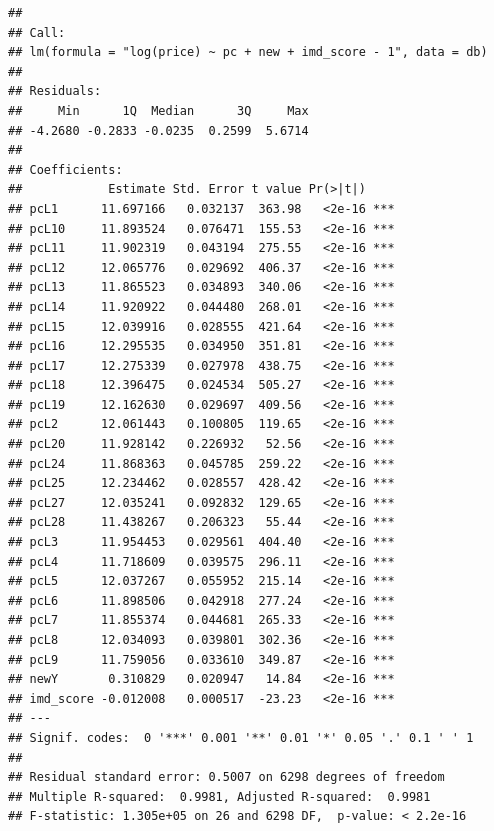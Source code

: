 \documentclass[
]{book}
\begin{document}
\begin{verbatim}
## 
## Call:
## lm(formula = "log(price) ~ pc + new + imd_score - 1", data = db)
## 
## Residuals:
##     Min      1Q  Median      3Q     Max 
## -4.2680 -0.2833 -0.0235  0.2599  5.6714 
## 
## Coefficients:
##            Estimate Std. Error t value Pr(>|t|)    
## pcL1      11.697166   0.032137  363.98   <2e-16 ***
## pcL10     11.893524   0.076471  155.53   <2e-16 ***
## pcL11     11.902319   0.043194  275.55   <2e-16 ***
## pcL12     12.065776   0.029692  406.37   <2e-16 ***
## pcL13     11.865523   0.034893  340.06   <2e-16 ***
## pcL14     11.920922   0.044480  268.01   <2e-16 ***
## pcL15     12.039916   0.028555  421.64   <2e-16 ***
## pcL16     12.295535   0.034950  351.81   <2e-16 ***
## pcL17     12.275339   0.027978  438.75   <2e-16 ***
## pcL18     12.396475   0.024534  505.27   <2e-16 ***
## pcL19     12.162630   0.029697  409.56   <2e-16 ***
## pcL2      12.061443   0.100805  119.65   <2e-16 ***
## pcL20     11.928142   0.226932   52.56   <2e-16 ***
## pcL24     11.868363   0.045785  259.22   <2e-16 ***
## pcL25     12.234462   0.028557  428.42   <2e-16 ***
## pcL27     12.035241   0.092832  129.65   <2e-16 ***
## pcL28     11.438267   0.206323   55.44   <2e-16 ***
## pcL3      11.954453   0.029561  404.40   <2e-16 ***
## pcL4      11.718609   0.039575  296.11   <2e-16 ***
## pcL5      12.037267   0.055952  215.14   <2e-16 ***
## pcL6      11.898506   0.042918  277.24   <2e-16 ***
## pcL7      11.855374   0.044681  265.33   <2e-16 ***
## pcL8      12.034093   0.039801  302.36   <2e-16 ***
## pcL9      11.759056   0.033610  349.87   <2e-16 ***
## newY       0.310829   0.020947   14.84   <2e-16 ***
## imd_score -0.012008   0.000517  -23.23   <2e-16 ***
## ---
## Signif. codes:  0 '***' 0.001 '**' 0.01 '*' 0.05 '.' 0.1 ' ' 1
## 
## Residual standard error: 0.5007 on 6298 degrees of freedom
## Multiple R-squared:  0.9981, Adjusted R-squared:  0.9981 
## F-statistic: 1.305e+05 on 26 and 6298 DF,  p-value: < 2.2e-16
\end{verbatim}
\end{document}

